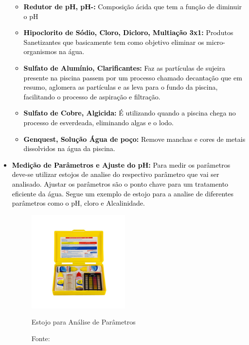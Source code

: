 \begin{itemize}
\begin{itemize}
                    \item \textbf{\textcolor{black}{Redutor de pH, pH-:}} \textcolor{black}{Composição ácida que tem a função de diminuir o pH}
    
                    \item \textbf{\textcolor{black}{Hipoclorito de Sódio, Cloro, Dicloro, Multiação 3x1:}} \textcolor{black}{Produtos Sanetizantes que basicamente tem como objetivo eliminar os micro-organismos na água.}
    
                    \item \textbf{\textcolor{black}{Sulfato de Alumínio, Clarificantes:}} \textcolor{black}{Faz as partículas de sujeira presente na piscina passem por um processo chamado decantação que em resumo, aglomera as partículas e as leva para o fundo da piscina, facilitando o processo de aspiração e filtração.}
    
                    \item \textbf{\textcolor{black}{Sulfato de Cobre, Algicida:}} \textcolor{black}{É utilizando quando a piscina chega no processo de esverdeada, eliminando algas e o lodo.}
    
                    \item \textbf{\textcolor{black}{Genquest, Solução Água de poço:}} \textcolor{black}{Remove manchas e cores de metais dissolvidos na água da piscina.}
    
                \end{itemize}
                
            \item \textbf{\textcolor{black}{Medição de Parâmetros e Ajuste do pH:}} \textcolor{black}{Para medir os parâmetros deve-se utilizar estojos de analise do respectivo parâmetro que vai ser analisado. Ajustar os parâmetros são o ponto chave para um tratamento eficiente da água. Segue um exemplo de estojo para a analise de diferentes parâmetros como o pH, cloro e Alcalinidade.}

            \begin{figure}[H]
                    \centering
                    \caption{ }  
                	\centering
                    \label{fig:cont}
                	\includegraphics[width=0.48\textwidth]{imagens/estojoMedidor.png}
                    \caption*{Estojo para Análise de Parâmetros}
                	\caption*{Fonte: \cite{gencoEmpresa}}
            \end{figure}


\end{itemize}
